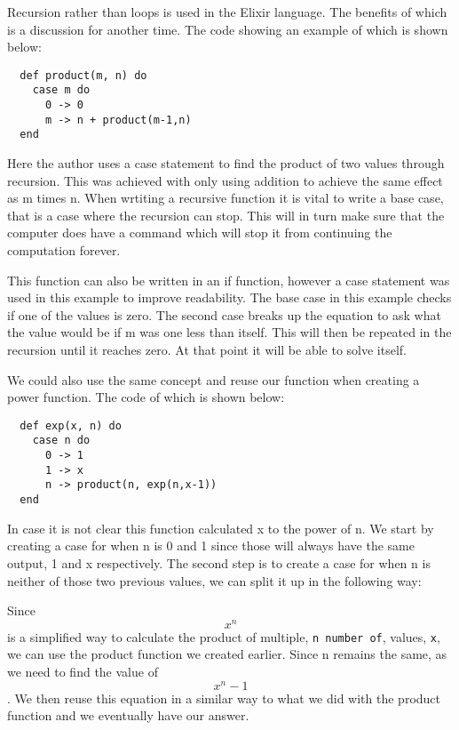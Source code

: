 \documentclass[a4paper,11pt]{article}
\begin{document}
Recursion rather than loops is used in the Elixir language. The benefits of which is a discussion for another time. The code showing an example of which is shown below:

\begin{verbatim}
  def product(m, n) do
    case m do
      0 -> 0
      m -> n + product(m-1,n)
  end
\end{verbatim}

Here the author uses a case statement to find the product of two values through recursion. This was achieved with only using addition to achieve the same effect as m times n. When wrtiting a recursive function it is vital to write a base case, that is a case where the recursion can stop. This will in turn make sure that the computer does have a command which will stop it from continuing the computation forever.

This function can also be written in an if function, however a case statement was used in this example to improve readability. The base case in this example checks if one of the values is zero. The second case breaks up the equation to ask what the value would be if m was one less than itself. This will then be repeated in the recursion until it reaches zero. At that point it will be able to solve itself. 

We could also use the same concept and reuse our function when creating a power function. The code of which is shown below:

\begin{verbatim}
  def exp(x, n) do
    case n do
      0 -> 1
      1 -> x
      n -> product(n, exp(n,x-1))
  end
\end{verbatim}

In case it is not clear this function calculated x to the power of n. We start by creating a case for when n is 0 and 1 since those will always have the same output, 1 and x respectively. The second step is to create a case for when n is neither of those two previous values, we can split it up in the following way:

Since \begin{equation}x^n\end{equation} is a simplified way to calculate the product of multiple, {\tt n number of}, values, {\tt x}, we can use the product function we created earlier. Since n remains the same, as we need to find the value of \begin{equation}x^n-1\end{equation}. We then reuse this equation in a similar way to what we did with the product function and we eventually have our answer.
\end{document}

